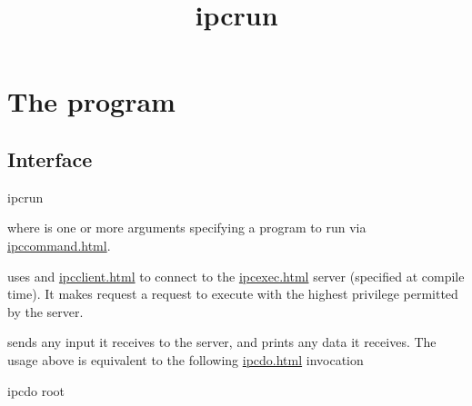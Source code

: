 \documentclass{book}
\title{ipcrun}
\begin{document}
\section{The  program}

\subsection{Interface}
\begin{code}%
  ipcrun 
\end{code}
where  is one or more arguments specifying a program to run via
\href{\cmd{ipccommand}}{ipccommand.html}.

 uses  and \href{\cmd{ipcclient}}{ipcclient.html} to
connect to the \href{\cmd{ipcexec}}{ipcexec.html} server (specified at compile
time).  It makes request a request to execute  with the highest
privilege permitted by the server.

 sends any input it receives to the  server, and prints
any data it receives.  The usage above is equivalent to the following
\href{\cmd{ipcdo}}{ipcdo.html} invocation
\begin{code}%
  ipcdo root 
\end{code}
\end{document}
